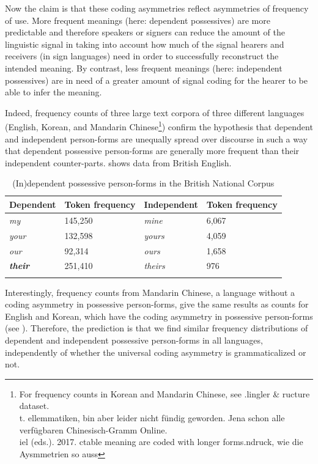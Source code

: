 \documentclass[output=paper]{langsci/langscibook}
\begin{document}
Now the claim is that these coding asymmetries reflect asymmetries of frequency of use. More frequent meanings (here: dependent possessives) are more predictable and therefore speakers or signers can reduce the amount of the linguistic signal in taking into account how much of the signal hearers and receivers (in sign languages) need in order to successfully reconstruct the intended meaning. By contrast, less frequent meanings (here: independent possessives) are in need of a greater amount of signal coding for the hearer to be able to infer the meaning. 

Indeed, frequency counts of three large text corpora of three different languages (English, Korean, and Mandarin Chinese\footnote{For frequency counts in Korean and Mandarin Chinese, see \citealt{Ye2017}.lingler \& ructure dataset. \\
t. ellemmatiken, bin aber leider nicht fündig geworden. Jena schon alle verfügbaren Chinesisch-Gramm Online. \\
iel (eds.). 2017. ctable meaning are coded with longer forms.ndruck, wie die Aysmmetrien so auss}) confirm the hypothesis that dependent and independent person-forms are unequally spread over discourse in such a way that dependent possessive person-forms are generally more frequent than their independent counter-parts.  shows data from British English.

\begin{table}
\begin{tabularx}{\textwidth}{XXXX}
\lsptoprule

\bfseries Dependent & \bfseries Token frequency & \bfseries Independent & \bfseries Token frequency\\
\midrule
\textit{my} & 145,250 & \textit{mine} & 6,067\\
\textit{your} & 132,598 & \textit{yours} & 4,059\\
\textit{our} & 92,314 & \textit{ours} & 1,658\\
\textbf{\textit{their}}{\textbf{\textit{~}}} & 251,410 & \textit{theirs} & 976\\
\lspbottomrule
\end{tabularx}

\caption{(In)dependent possessive person-forms in the British National Corpus}
\label{tab:2}
\end{table}

Interestingly, frequency counts from Mandarin Chinese, a language without a coding asymmetry in possessive person-forms, give the same results as counts for English and Korean, which have the coding asymmetry in possessive person-forms (see \citealt{Ye2017}). Therefore, the prediction is that we find similar frequency distributions of dependent and independent possessive person-forms in all languages, independently of whether the universal coding asymmetry is grammaticalized or not.
\end{document}
